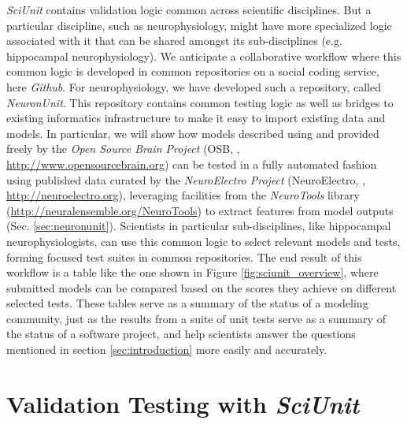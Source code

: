 \documentclass{frontiersSCNS}
\begin{document}
\textit{SciUnit} contains validation logic common across scientific disciplines.
But a particular discipline, such as neurophysiology, might have more specialized logic associated with it that can be shared amongst its sub-disciplines (e.g. hippocampal neurophysiology). 
We anticipate a collaborative workflow where this common logic is developed in common repositories on a social coding service, here \textit{Github}. 
For neurophysiology, we have developed such a repository, called \textit{NeuronUnit}. 
This repository contains common testing logic as well as bridges to existing informatics infrastructure to make it easy to import existing data and models. 
In particular, we will show how models described using  and provided freely by the \textit{Open Source Brain Project} (OSB, \cite{gleeson_open_2012}, \url{http://www.opensourcebrain.org}) can be tested in a fully automated fashion using published data curated by the \textit{NeuroElectro Project} (NeuroElectro, \cite{tripathy_neuroelectro:_2012}, \url{http://neuroelectro.org}), leveraging facilities from the \textit{NeuroTools} library (\url{http://neuralensemble.org/NeuroTools}) to extract features from model outputs (Sec. \ref{sec:neuronunit}). 
Scientists in particular sub-disciplines, like hippocampal neurophysiologists, can use this common logic to select relevant models and tests, forming focused test suites in common repositories. 
The end result of this workflow is a table like the one shown in Figure \ref{fig:sciunit_overview}, where submitted models can be compared based on the scores they achieve on different selected tests. 
These tables serve as a summary of the status of a modeling community, just as the results from a suite of unit tests serve as a summary of the status of a software project, and help scientists answer the questions mentioned in section \ref{sec:introduction} more easily and accurately.

\section{Validation Testing with \textit{SciUnit}}\label{sec:sciunit}
\end{document}
